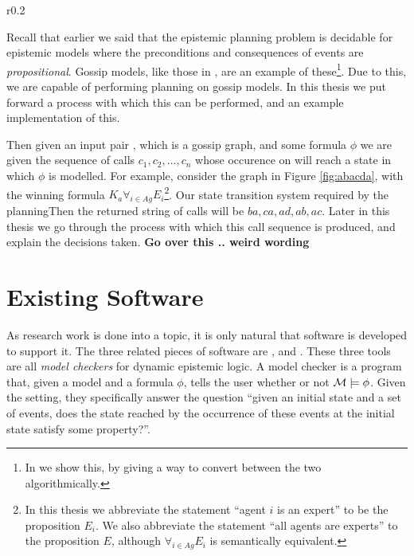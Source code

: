 \documentclass[10pt, a4paper]{report}
\begin{document}
\begin{wrapfigure}{r}{0.2\textwidth}
  \centering
  \caption{}
  \label{fig:abacda}
\end{wrapfigure}

Recall that earlier we said that the epistemic planning problem is decidable for
epistemic models where the preconditions and consequences of events are
\emph{propositional}. Gossip models, like those in ,
are an example of these\footnote{In  we show this, by
giving a way to convert between the two algorithmically.}. Due to this, we are
capable of performing planning on gossip models. In this thesis we put forward a
process with which this can be performed, and an example implementation of this.

Then given an input pair , which is a gossip graph, and some formula
$\phi$ we are given the sequence of calls $c_1, c_2, \ldots, c_n$ whose
occurence on  will reach a state in which $\phi$ is modelled. For
example, consider the graph in Figure \ref{fig:abacda}, with the winning formula
$K_a \forall_{i \in Ag} E_i$\footnote{In this thesis we abbreviate the statement
``agent $i$ is an expert'' to be the proposition $E_i$. We also abbreviate the
statement ``all agents are experts'' to the proposition $E$, although
$\forall_{i \in Ag}E_i$ is semantically equivalent.}. Our state transition
system required by the planningThen the returned string
of calls will be $ba, ca, ad, ab, ac$. Later in this thesis we go through the
process with which this call sequence is produced, and explain the decisions
taken.  \textbf{Go over this .. weird wording}

\section{Existing Software}

As research work is done into a topic, it is only natural that software is
developed to support it. The three related pieces of software are
\cite{DEMO-S5}, \cite{SMCDEL} and \cite{GithubGossip}. These three tools are all
\emph{model checkers} for dynamic epistemic logic. A model checker is a
program that, given a model  and a formula $\phi$, tells the user whether
or not $\mathcal{M} \models \phi$. Given the setting, they specifically answer the
question ``given an initial state and a set of events, does the state reached by
the occurrence of these events at the initial state satisfy some property?''.
\end{document}
